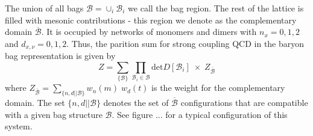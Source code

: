 \documentclass{PoS}
\begin{document}
The union of all bags $\mathcal{B} = \cup_i \mathcal{B}_i$ we call the bag region. The rest of the lattice is filled with mesonic contributions - this region we denote as the complementary domain $\overline{\mathcal{B}}$. It is occupied by networks of  monomers and dimers with $n_x = 0,1,2$ and $d_{x,\nu} = 0,1,2$. Thus, the parition sum for strong coupling QCD in the baryon bag representation is given by
\begin{equation}
Z = \sum_{\{\mathcal{B}\}}\prod_{\mathcal{B}_i \in \mathcal{B}} \text{det}D[\mathcal{B}_i] \; \times \; Z_{\overline{\mathcal{B}}}
\end{equation}
where $Z_{\overline{\mathcal{B}}} = \sum_{\{n, d || \mathcal{B}\}} w_n(m) \; w_d(t)$ is the weight for the complementary domain. The set $\{n, d || \mathcal{B}\}$ denotes the set of $\overline{\mathcal{B}}$ configurations that are compatible with a given bag structure $\mathcal{B}$. See figure ... for a typical configuration of this system.\\
\\
\end{document}
